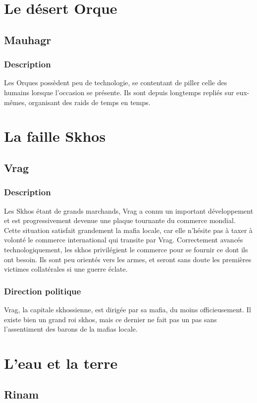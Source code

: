 \section{Le désert Orque}
\subsection{Mauhagr}
\subsubsection{Description}
Les Orques possèdent peu de technologie, se contentant de piller celle des humains lorsque l'occasion se présente. Ils sont depuis longtemps repliés sur eux-mêmes, organisant des raids de temps en temps.
\section{La faille Skhos}
\subsection{Vrag}
\subsubsection{Description}
Les Skhos étant de grands marchands, Vrag a connu un important développement et est progressivement devenue une plaque tournante du commerce mondial. Cette situation satisfait grandement la mafia locale, car elle n'hésite pas à taxer à volonté le commerce international qui transite par Vrag. Correctement avancés technologiquement, les skhos privilégient le commerce pour se fournir ce dont ils ont besoin. Ils sont peu orientés vers les armes, et seront sans doute les premières victimes collatérales si une guerre éclate.
\subsubsection{Direction politique}
Vrag, la capitale skhossienne, est dirigée par sa mafia, du moins officieusement. Il existe bien un grand roi skhos, mais ce dernier ne fait pas un pas sans l'assentiment des barons de la mafias locale.
\section{L'eau et la terre}
\subsection{Rinam}
